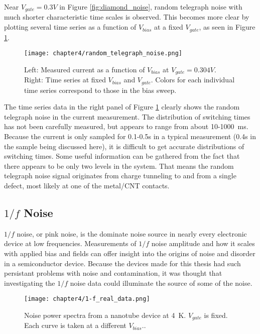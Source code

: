 Near $V_{gate} = 0.3V$ in Figure \ref{fig:diamond_noise}, random telegraph noise with much shorter characteristic time scales is observed. This becomes more clear by plotting several time series as a function of $V_{bias}$ at a fixed $V_{gate}$, as seen in Figure \ref{fig:rts_bias}.

\begin{figure}
    \centering
    \texttt{[image: chapter4/random\_telegraph\_noise.png]}
    \caption{Left: Measured current as a function of $V_{bias}$ at $V_{gate} = 0.304V$. Right: Time series at fixed $V_{bias}$ and $V_{gate}$. Colors for each individual time series correspond to those in the bias sweep.}
    \label{fig:rts_bias}
\end{figure}

The time series data in the right panel of Figure \ref{fig:rts_bias} clearly shows the random telegraph noise in the current measurement. The distribution of switching times has not been carefully measured, but appears to range from about 10-\SI{1000}{\milli\second}. Because the current is only sampled for 0.1-0.5s in a typical measurement (0.4s in the sample being discussed here), it is difficult to get accurate distributions of switching times. Some useful information can be gathered from the fact that there appears to be only two levels in the system. That means the random telegraph noise signal originates from charge tunneling to and from a single defect, most likely at one of the metal/CNT contacts.

\subsection{$1/f$ Noise}

$1/f$ noise, or pink noise, is the dominate noise source in nearly every electronic device at low frequencies. Measurements of $1/f$ noise amplitude and how it scales with applied bias and fields can offer insight into the origins of noise and disorder in a semiconductor device. Because the devices made for this thesis had such persistant problems with noise and contamination, it was thought that investigating the $1/f$ noise data could illuminate the source of some of the noise.


\begin{figure}
    \centering
    \texttt{[image: chapter4/1-f\_real\_data.png]}
    \caption{Noise power spectra from a nanotube device at \SI{4}{\kelvin}. $V_{gate}$ is fixed. Each curve is taken at a different $V_{bias}.$.}
    \label{fig:1-f_data}
\end{figure}

